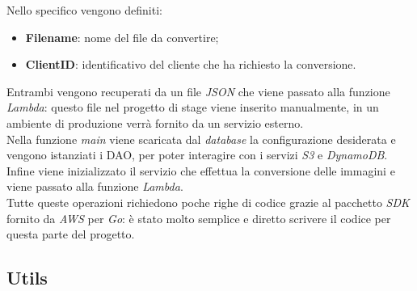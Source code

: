 
Nello specifico vengono definiti:
\begin{itemize}
      \item \textbf{Filename}: nome del file da convertire;
      \item \textbf{ClientID}: identificativo del cliente che ha richiesto la
            conversione.
\end{itemize}
Entrambi vengono recuperati da un file \emph{JSON} che viene passato alla
funzione \emph{Lambda}: questo file nel progetto di stage viene inserito
manualmente, in un ambiente di produzione verrà fornito da un servizio
esterno.\\
Nella funzione \emph{main} viene scaricata dal \emph{database} la configurazione desiderata e
vengono istanziati i \glsfirstoccur\gls{DAO}, per poter
interagire con i servizi \emph{S3} e \emph{DynamoDB}. Infine viene
inizializzato il servizio che effettua la conversione delle immagini e viene
passato alla funzione \emph{Lambda}. \\
Tutte queste operazioni richiedono poche righe di codice grazie al pacchetto
\emph{SDK} fornito da \emph{AWS} per \emph{Go}: è stato molto semplice e diretto
scrivere il codice per questa parte del progetto.


\subsection{Utils}

